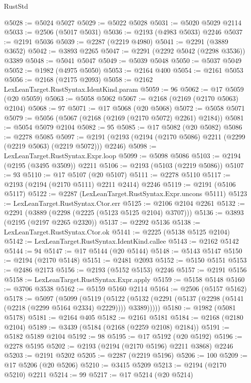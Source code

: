 \begin{lexlean}{RustStd}
\begin{coremodule}
@5028 := @5024 @5027
@5029 := @5022 @5028
@5031 := @5020 @5029 @2114
@5033 := @2506 (@5017 @5031)
@5036 := @2193 (@4983 @5033) @2246
@5037 := @2191 @5036
@5039 := @2287 (@2219 @4980)
@5041 := @2291 (@3889 @3652)
@5042 := @3893 @2265
@5047 := @2291 (@2292 @5042 (@2298 @3536)) @3389
@5048 := @5041 @5047
@5049 := @5039 @5048
@5050 := @5037 @5049
@5052 := @1982 (@4975 @5050)
@5053 := @2164 @400
@5054 := @2161 @5053
@5056 := @2168 (@2175 @2093)
@5058 := @2162 LexLeanTarget.RustSyntax.IdentKind.param
@5059 := 96
@5062 := @17 @5059 (@20 @5059)
@5063 := @5058 @5062
@5067 := @2168 (@2169 (@2170 @5063) @2104)
@5068 := 97
@5071 := @17 @5068 (@20 @5068)
@5072 := @5058 @5071
@5079 := @5056 (@5067 (@2168 (@2169 (@2170 @5072) @2261) @2184))
@5081 := @5054 @5079 @2104
@5082 := 95
@5085 := @17 @5082 (@20 @5082)
@5086 := @2278 @5085
@5097 := @2191 (@2193 (@2194 (@2170 @5086) @2211 (@2299 (@2219 @5063) (@2219 @5072))) @2246)
@5098 := LexLeanTarget.RustSyntax.Expr.loop
@5099 := @5098 @5086
@5103 := @2194 (@2195 (@3495 @3509)) @2211
@5106 := @2193 (@5103 (@2219 @5086))
@5107 := 93
@5110 := @17 @5107 (@20 @5107)
@5111 := @2278 @5110
@5117 := @2193 (@2194 (@2170 @5111) @2211 @2414) @2246
@5119 := @2191 (@5106 @5117)
@5122 := @2287 (LexLeanTarget.RustSyntax.Expr.uncons @5111)
@5123 := LexLeanTarget.RustSyntax.Ctor.err
@5125 := @2106 @2104 @2261
@5132 := @2291 (@3889 (@2298 (@2225 (@5123 @5125 @2104) @3707)))
@5136 := @3893 (@2195 (@2197 @2265 @2320))
@5137 := @2292 @5136
@5138 := LexLeanTarget.RustSyntax.Ctor.ok
@5141 := @2225 (@5138 @5125 @2104)
@5142 := LexLeanTarget.RustSyntax.IdentKind.callee
@5143 := @2162 @5142
@5144 := 94
@5147 := @17 @5144 (@20 @5144)
@5148 := @5143 @5147
@5150 := @2194 (@2170 @5148)
@5151 := @2481 @2093
@5152 := @5150 @5151
@5153 := @2486 @2173
@5156 := @2193 (@5152 @5153) @2246
@5157 := @2191 @5156
@5158 := LexLeanTarget.RustSyntax.Expr.apply
@5159 := @5158 @5148
@5160 := @3706 @3538
@5162 := @5159 @5160 @2114
@5164 := @2506 (@5157 @5162)
@5178 := @5097
    (@5099
      (@5119
        (@5122 (@5132 (@2291 (@5137 (@2298 (@5141 (@2218 (@2299 @5164 @2334) @2229)))) @3389)))))
@5180 := @1982 (@5081 @5178)
@5181 := @2164 @405
@5182 := @2161 @5181
@5184 := @2168 (@2180 @2104)
@5189 := @3439 (@5184 (@2168 (@2259 @2108) @2184))
@5191 := @5182 @5189 @2104
@5192 := 98
@5195 := @17 @5192 (@20 @5192)
@5196 := @2278 @5195
@5202 := @2193 (@2194 (@2170 @5196) @2211 @3868) @2246
@5203 := @2191 @5202
@5205 := @2287 (@2219 @5196)
@5206 := 100
@5209 := @17 @5206 (@20 @5206)
@5210 := @3415 @5209
@5213 := @2194 (@2170 @5210) @2211
@5214 := 99
@5217 := @17 @5214 (@20 @5214)

\end{coremodule}
\end{lexlean}
